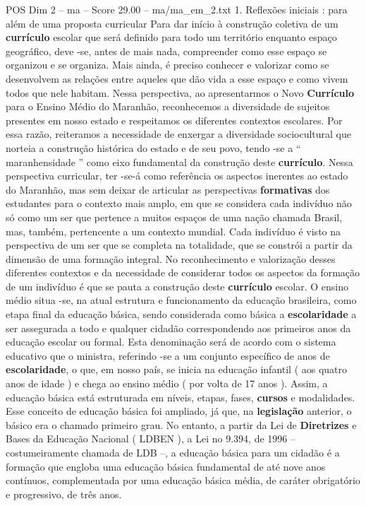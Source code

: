 \begin{textsample}{POS Dim 2 – ma – Score 29.00 – ma/ma\_em\_2.txt}  \label{ex:f2_pos_055}
1.
Reflexões iniciais : para além de uma proposta curricular Para dar início à construção coletiva de um \textbf{currículo} escolar que será definido para todo um território enquanto espaço geográfico, deve -se, antes de mais nada, compreender como esse espaço se organizou e se organiza.
Mais ainda, é preciso conhecer e valorizar como se desenvolvem as relações entre aqueles que dão vida a esse espaço e como vivem todos que nele habitam.
Nessa perspectiva, ao apresentarmos o Novo \textbf{Currículo} para o Ensino Médio do Maranhão, reconhecemos a diversidade de sujeitos presentes em nosso estado e respeitamos os diferentes contextos escolares.
Por essa razão, reiteramos a necessidade de enxergar a diversidade sociocultural que norteia a construção histórica do estado e de seu povo, tendo -se a “ maranhensidade ” como eixo fundamental da construção deste \textbf{currículo}.
Nessa perspectiva curricular, ter -se-á como referência os aspectos inerentes ao estado do Maranhão, mas sem deixar de articular as perspectivas \textbf{formativas} dos estudantes para o contexto mais amplo, em que se considera cada indivíduo não só como um ser que pertence a muitos espaços de uma nação chamada Brasil, mas, também, pertencente a um contexto mundial.
Cada indivíduo é visto na perspectiva de um ser que se completa na totalidade, que se constrói a partir da dimensão de uma formação integral.
No reconhecimento e valorização desses diferentes contextos e da necessidade de considerar todos os aspectos da formação de um indivíduo é que se pauta a construção deste \textbf{currículo} escolar.
O ensino médio situa -se, na atual estrutura e funcionamento da educação brasileira, como etapa final da educação básica, sendo considerada como básica a \textbf{escolaridade} a ser assegurada a todo e qualquer cidadão correspondendo aos primeiros anos da educação escolar ou formal.
Esta denominação será de acordo com o sistema educativo que o ministra, referindo -se a um conjunto específico de anos de \textbf{escolaridade}, o que, em nosso país, se inicia na educação infantil ( aos quatro anos de idade ) e chega ao ensino médio ( por volta de 17 anos ).
Assim, a educação básica está estruturada em níveis, etapas, fases, \textbf{cursos} e modalidades.
Esse conceito de educação básica foi ampliado, já que, na \textbf{legislação} anterior, o básico era o chamado primeiro grau.
No entanto, a partir da Lei de \textbf{Diretrizes} e Bases da Educação Nacional ( LDBEN ), a Lei no 9.394, de 1996 – costumeiramente chamada de LDB –, a educação básica para um cidadão é a formação que engloba uma educação básica fundamental de até nove anos contínuos, complementada por uma educação básica média, de caráter obrigatório e progressivo, de três anos.

\end{textsample}
